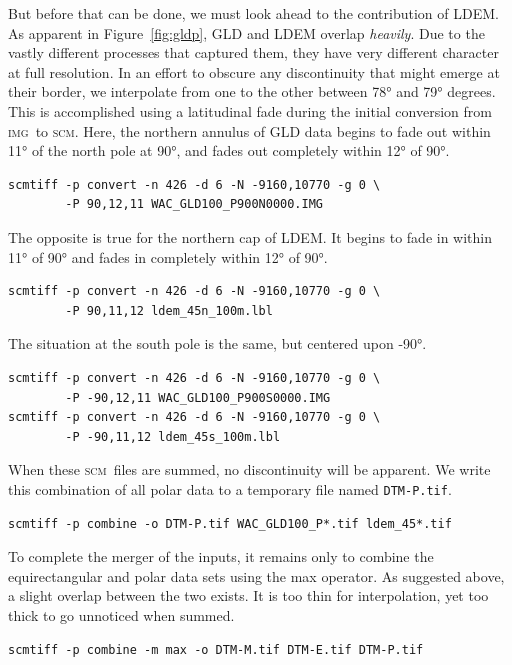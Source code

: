 \documentclass[oneside,10pt]{memoir}
\newcommand{\scm}     {\textsc{scm}}
\newcommand{\img}     {\textsc{img}}
\begin{document}
\begin{Spacing}{1.1}
But before that can be done, we must look ahead to the contribution of LDEM. As apparent in Figure~\ref{fig:gldp}, GLD and LDEM overlap \emph{heavily}. Due to the vastly different processes that captured them, they have very different character at full resolution. In an effort to obscure any discontinuity that might emerge at their border, we interpolate from one to the other between \ang{78} and \ang{79} degrees. This is accomplished using a latitudinal fade during the initial conversion from \img\ to \scm. Here, the northern annulus of GLD data begins to fade out within \ang{11} of the north pole at \ang{90}, and fades out completely within \ang{12} of \ang{90}.

\begin{Verbatim}
scmtiff -p convert -n 426 -d 6 -N -9160,10770 -g 0 \
        -P 90,12,11 WAC_GLD100_P900N0000.IMG
\end{Verbatim}

The opposite is true for the northern cap of LDEM. It begins to fade in within \ang{11} of \ang{90} and fades in completely within \ang{12} of \ang{90}.

\begin{Verbatim}
scmtiff -p convert -n 426 -d 6 -N -9160,10770 -g 0 \
        -P 90,11,12 ldem_45n_100m.lbl
\end{Verbatim}

The situation at the south pole is the same, but centered upon \ang{-90}.

\begin{Verbatim}
scmtiff -p convert -n 426 -d 6 -N -9160,10770 -g 0 \
        -P -90,12,11 WAC_GLD100_P900S0000.IMG
scmtiff -p convert -n 426 -d 6 -N -9160,10770 -g 0 \
        -P -90,11,12 ldem_45s_100m.lbl
\end{Verbatim}

When these \scm\ files are summed, no discontinuity will be apparent. We write this combination of all polar data to a temporary file named \texttt{DTM-P.tif}.

\begin{Verbatim}
scmtiff -p combine -o DTM-P.tif WAC_GLD100_P*.tif ldem_45*.tif
\end{Verbatim}

To complete the merger of the inputs, it remains only to combine the equirectangular and polar data sets using the max operator. As suggested above, a slight overlap between the two exists. It is too thin for interpolation, yet too thick to go unnoticed when summed.

\begin{Verbatim}
scmtiff -p combine -m max -o DTM-M.tif DTM-E.tif DTM-P.tif
\end{Verbatim}


\end{Spacing}
\end{document}
